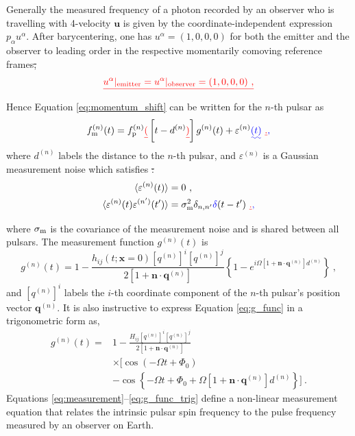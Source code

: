 \documentclass[fleqn,usenatbib,useAMS]{mnras}
\providecommand{\DIFadd}[1]{{\protect\color{blue}\uwave{#1}}} %
\providecommand{\DIFdel}[1]{{\protect\color{red}\sout{#1}}}                      %
\providecommand{\DIFaddbegin}{} %
\providecommand{\DIFaddend}{} %
\providecommand{\DIFdelbegin}{} %
\providecommand{\DIFdelend}{} %
\newcommand{\DIFscaledelfig}{0.5}
\newlength{\DIFdelgraphicswidth} %
\newlength{\DIFdelgraphicsheight} %
\newcommand{\DIFaddincludegraphics}[2][]{{\color{blue}\fbox{\DIFOincludegraphics[#1]{#2}}}} %
\newcommand{\DIFdelincludegraphics}[2][]{%
\sbox{\DIFdelgraphicsbox}{\DIFOincludegraphics[#1]{#2}}%
\settoboxwidth{\DIFdelgraphicswidth}{\DIFdelgraphicsbox} %
\settoboxtotalheight{\DIFdelgraphicsheight}{\DIFdelgraphicsbox} %
\scalebox{\DIFscaledelfig}{%
\parbox[b]{\DIFdelgraphicswidth}{\usebox{\DIFdelgraphicsbox}\\[-\baselineskip] \rule{\DIFdelgraphicswidth}{0em}}\llap{\resizebox{\DIFdelgraphicswidth}{\DIFdelgraphicsheight}{%
\setlength{\unitlength}{\DIFdelgraphicswidth}%
\begin{picture}(1,1)%
\thicklines\linethickness{2pt} %
{\color[rgb]{1,0,0}\put(0,0){\framebox(1,1){}}}%
{\color[rgb]{1,0,0}\put(0,0){\line( 1,1){1}}}%
{\color[rgb]{1,0,0}\put(0,1){\line(1,-1){1}}}%
\end{picture}%
}\hspace*{3pt}}} %
} %
\DeclareRobustCommand{\DIFaddbegin}{\DIFOaddbegin \let\includegraphics\DIFaddincludegraphics} %
\DeclareRobustCommand{\DIFaddend}{\DIFOaddend \let\includegraphics\DIFOincludegraphics} %
\DeclareRobustCommand{\DIFdelbegin}{\DIFOdelbegin \let\includegraphics\DIFdelincludegraphics} %
\DeclareRobustCommand{\DIFdelend}{\DIFOaddend \let\includegraphics\DIFOincludegraphics} %
\begin{document}
\DIFaddend Generally the measured frequency of a photon recorded by an observer who is travelling with 4-velocity $\boldsymbol{u}$ is given by the coordinate-independent expression $p_{\alpha} u^{\alpha}$. After barycentering, one has $u^{\alpha} =(1,0,0,0)$ for both the emitter and the observer to leading order in the respective momentarily comoving reference frames\DIFdelbegin \DIFdel{,
}\begin{displaymath}
	\DIFdel{u^{\alpha}|_{\rm emitter} = u^{\alpha}|_{\rm observer} = (1,0,0,0) \ ,
}\end{displaymath}%
\DIFdelend \DIFaddbegin \DIFadd{. }\DIFaddend Hence Equation \eqref{eq:momentum_shift} can be written for the $n$-th pulsar as
\begin{equation}
	f_{\rm m}^{(n)}(t) = f_{\rm p}^{(n)}\DIFdelbegin \DIFdel{(}\DIFdelend \DIFaddbegin \left [\DIFaddend t-d^{(n)} \DIFdelbegin \DIFdel{) }\DIFdelend \DIFaddbegin \right ] \DIFaddend g^{(n)}(t) +  \varepsilon^{(n)}\DIFaddbegin \DIFadd{(t)}\DIFaddend \ \DIFdelbegin \DIFdel{.
	}\DIFdelend \DIFaddbegin \DIFadd{,
	}\DIFaddend \label{eq:measurement}
\end{equation}
where $d^{(n)}$ labels the distance to the $n$-th pulsar, and $\varepsilon^{(n)}$ is a Gaussian measurement noise which satisfies 
\DIFdelbegin \DIFdel{: 
}\DIFdelend \begin{align}
	\langle \varepsilon^{(n)}(t) \rangle &= 0 \ , \\
	\langle \varepsilon^{(n)}(t) \varepsilon^{(n')}(t') \rangle &= \sigma_{\rm m}^2 \delta_{n,n'} \DIFaddbegin \DIFadd{\delta}\DIFaddend (t - t') \ \DIFdelbegin \DIFdel{.	}\DIFdelend \DIFaddbegin \DIFadd{,	}\DIFaddend \label{eq:vareps}
\end{align}
where $\sigma_{\rm m}$ is the covariance of the measurement noise \DIFaddbegin \DIFadd{at the telescope }\DIFaddend and is shared between all pulsars. The measurement function $g^{(n)}(t)$ is
\begin{equation}
	g^{(n)}(t) = 1 - \frac{h_{ij} (t; \boldsymbol{x}= 0)[q^{(n)}]^i [q^{(n)}]^j}{2[1 + \boldsymbol{n}\cdot \boldsymbol{q}^{(n)}] }  \left \{1 -e^{i \Omega \left[1 + \boldsymbol{n}\cdot \boldsymbol{q}^{(n)} \right]  d^{(n)}}\right \} \ ,
	\label{eq:g_func}
\end{equation}
and $[q^{(n)}]^i$ labels the $i$-th coordinate component of the $n$-th pulsar's position vector $\boldsymbol{q}^{(n)}$. It is also instructive to express Equation \eqref{eq:g_func} in a trigonometric form as,
\begin{align}
	g^{(n)}(t) =& 1 - \frac{ H_{ij}[q^{(n)}]^i [q^{(n)}]^j }{2 [1 + \boldsymbol{n}\cdot \boldsymbol{q}^{(n)}] } \nonumber \\
	& \times \Big[\cos\left(-\Omega t +\Phi_0\right) \nonumber \\
	&- \cos \left \{-\Omega t +\Phi_0 + \Omega \left[1 + \boldsymbol{n}\cdot \boldsymbol{q}^{(n)} \right]  d^{(n)} \right \} \Big ] \ .
	\label{eq:g_func_trig}
\end{align}
Equations \eqref{eq:measurement}--\eqref{eq:g_func_trig}  define a non-linear measurement equation that relates the intrinsic pulsar spin frequency to the pulse frequency measured by an observer on Earth. 
\end{document}

